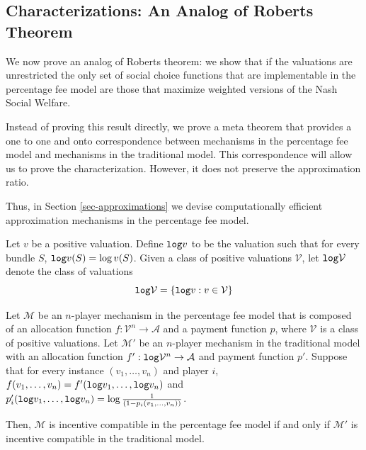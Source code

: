 \documentclass{theoretics}
\newcommand{\cM}{{\mathcal M}}
\newcommand{\cV}{{\mathcal V}}
\begin{document}
\subsection{Characterizations: An Analog of Roberts Theorem}\label{subsec-analog}

We now prove an analog of Roberts theorem: we show that if the valuations are unrestricted the only set of social choice functions that are implementable in the percentage fee model are those that maximize weighted versions of the Nash Social Welfare.

Instead of proving this result directly, we prove a meta theorem that provides a one to one and onto correspondence between mechanisms in the percentage fee model and mechanisms in the traditional model. This correspondence will allow us to prove the characterization. However, it does not preserve the approximation ratio.

Thus, in Section \ref{sec-approximations} we devise computationally efficient approximation mechanisms in the percentage fee model.









\begin{definition}
Let $v$ be a positive valuation. Define ${\tt log}v$ to be the valuation such that for every bundle $S$, ${\tt log}v(S)=\log v(S)$. Given a class of positive valuations $\cV$, let ${\tt log} \cV$ denote the class of valuations
$$ {\tt log} \cV = \{ {\tt log} v: v \in \cV \}$$
\end{definition}

\begin{theorem}\label{thm:meta}
Let $\cM$ be an $n$-player mechanism in the percentage fee model that is composed of an allocation function $f:\mathcal V^n\rightarrow \mathcal A$ and a payment function $p$, where $\mathcal V$ is a class of positive valuations. Let $\cM'$ be an $n$-player mechanism in the traditional model with an allocation function $f':{\tt log}\mathcal V^n\rightarrow \mathcal A$ and payment function $p'$. Suppose that for every instance $(v_1,\ldots, v_n)$ and player $i$, $f(v_1,\ldots, v_n)=f'({\tt log}v_1,\ldots,{\tt log} v_n)$ and $p'_i({\tt log}v_1,\ldots, {\tt log}v_n)=\log \frac 1 {(1-p_i(v_1,\ldots, v_n))}$. 

Then, $\cM$ is incentive compatible in the percentage fee model if and only if $\cM'$ is incentive compatible in the traditional model.
\end{theorem}
\end{document}
